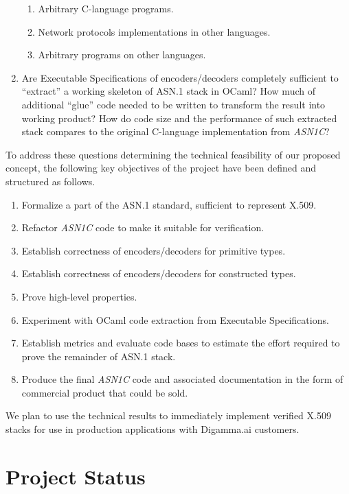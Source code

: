 \documentclass[acmsmall,nonacm]{acmart}
\begin{document}
\begin{enumerate}
\begin{enumerate}
    \item Arbitrary C-language programs.
    \item Network protocols implementations in other languages.
    \item Arbitrary programs on other languages.
    \end{enumerate}
  \item Are Executable Specifications of encoders/decoders completely sufficient to ``extract'' a working skeleton of ASN.1 stack in OCaml? How much of additional ``glue'' code needed to be written to transform the result into working product? How do code size and the performance of such extracted stack compares to the original C-language implementation from \emph{ASN1C}?  
\end{enumerate}

To address these questions determining the technical feasibility of
our proposed concept, the following key objectives of the project have
been defined and structured as follows.

\begin{enumerate}
\item Formalize a part of the ASN.1 standard, sufficient to represent X.509.
\item Refactor \emph{ASN1C} code to make it suitable for verification.
\item Establish correctness of encoders/decoders for primitive types.
\item Establish correctness of encoders/decoders for constructed types.
\item Prove high-level properties.
\item Experiment with OCaml code extraction from Executable Specifications.
\item Establish metrics and evaluate code bases to estimate the effort required to prove the remainder of ASN.1 stack.
\item Produce the final \emph{ASN1C} code and associated documentation in the form of commercial product that could be sold.
\end{enumerate}

We plan to use the technical results to immediately implement verified
X.509 stacks for use in production applications with Digamma.ai
customers.
 
\section{Project Status}
\end{document}
